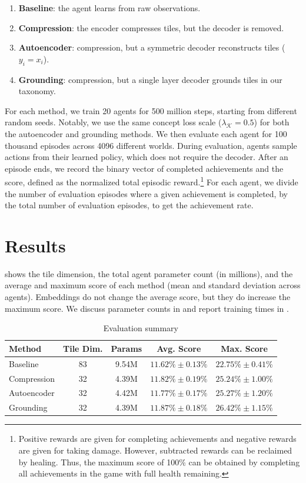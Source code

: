 \documentclass[final]{nesy2026}
\begin{document}
\begin{enumerate}
\item \textbf{Baseline}: the agent learns from raw observations.
\item \textbf{Compression}: the encoder compresses tiles, but the decoder is removed.
\item \textbf{Autoencoder}: compression, but a symmetric decoder reconstructs tiles ($y_i = x_i$).
\item \textbf{Grounding}: compression, but a single layer decoder grounds tiles in our taxonomy.
\end{enumerate}

For each method, we train 20 agents for 500 million steps, starting from different random seeds.
Notably, we use the same concept loss scale ($\lambda_{\mathcal K} = 0.5$) for both the autoencoder and grounding methods.
We then evaluate each agent for 100 thousand episodes across 4096 different worlds.
During evaluation, agents sample actions from their learned policy, which does not require the decoder.
After an episode ends, we record the binary vector of completed achievements and the score, defined as the normalized total episodic reward.\footnote{Positive rewards are given for completing achievements and negative rewards are given for taking damage. However, subtracted rewards can be reclaimed by healing. Thus, the maximum score of 100\% can be obtained by completing all achievements in the game with full health remaining.}
For each agent, we divide the number of evaluation episodes where a given achievement is completed, by the total number of evaluation episodes, to get the achievement rate.

\section{Results}
\label{sec:results}

 shows the tile dimension, the total agent parameter count (in millions), and the average and maximum score of each method (mean and standard deviation across agents).
Embeddings do not change the average score, but they do increase the maximum score.
We discuss parameter counts in  and report training times in .

\begin{table}[htbp]
{\caption{Evaluation summary}}
{\begin{tabular}{lcccc}
\toprule
\textbf{Method} & \textbf{Tile Dim.} & \textbf{Params} & \textbf{Avg. Score} & \textbf{Max. Score} \\
\midrule
Baseline    & 83 & 9.54M & $11.62\% \pm 0.13\%$ & $22.75\% \pm 0.41\%$ \\
Compression & 32 & 4.39M & $11.82\% \pm 0.19\%$ & $25.24\% \pm 1.00\%$ \\
Autoencoder & 32 & 4.42M & $11.77\% \pm 0.17\%$ & $25.27\% \pm 1.20\%$ \\
Grounding   & 32 & 4.39M & $11.87\% \pm 0.18\%$ & $26.42\% \pm 1.15\%$ \\
\bottomrule
\end{tabular}}
\end{table}
\end{document}
